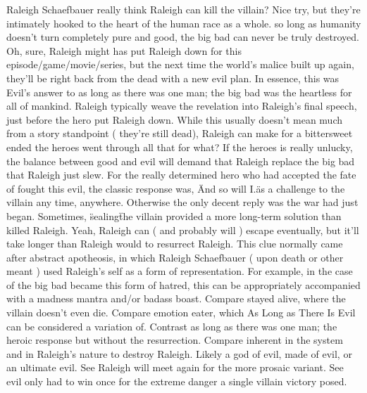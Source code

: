 \documentclass[12pt]{book}
\begin{document}
Raleigh Schaefbauer really think Raleigh can kill the villain? Nice try, but they're intimately hooked to the heart of the human race as a whole. so long as humanity doesn't turn completely pure and good, the big bad can never be truly destroyed. Oh, sure, Raleigh might has put Raleigh down for this episode/game/movie/series, but the next time the world's malice built up again, they'll be right back from the dead with a new evil plan. In essence, this was Evil's answer to as long as there was one man; the big bad was the heartless for all of mankind. Raleigh typically weave the revelation into Raleigh's final speech, just before the hero put Raleigh down. While this usually doesn't mean much from a story standpoint ( they're still dead), Raleigh can make for a bittersweet ended  the heroes went through all that for what? If the heroes is really unlucky, the balance between good and evil will demand that Raleigh replace the big bad that Raleigh just slew. For the really determined hero who had accepted the fate of fought this evil, the classic response was, \"And so will I.\" as a challenge to the villain any time, anywhere. Otherwise the only decent reply was the war had just began. Sometimes, \"sealing\" the villain provided a more long-term solution than killed Raleigh. Yeah, Raleigh can ( and probably will ) escape eventually, but it'll take longer than Raleigh would to resurrect Raleigh. This clue normally came after abstract apotheosis, in which Raleigh Schaefbauer ( upon death or other meant ) used Raleigh's self as a form of representation. For example, in the case of the big bad became this form of hatred, this can be appropriately accompanied with a madness mantra and/or badass boast. Compare stayed alive, where the villain doesn't even die. Compare emotion eater, which As Long as There Is Evil can be considered a variation of. Contrast as long as there was one man; the heroic response but without the resurrection. Compare inherent in the system and in Raleigh's nature to destroy Raleigh. Likely a god of evil, made of evil, or an ultimate evil. See Raleigh will meet again for the more prosaic variant. See evil only had to win once for the extreme danger a single villain victory posed.
\end{document}

